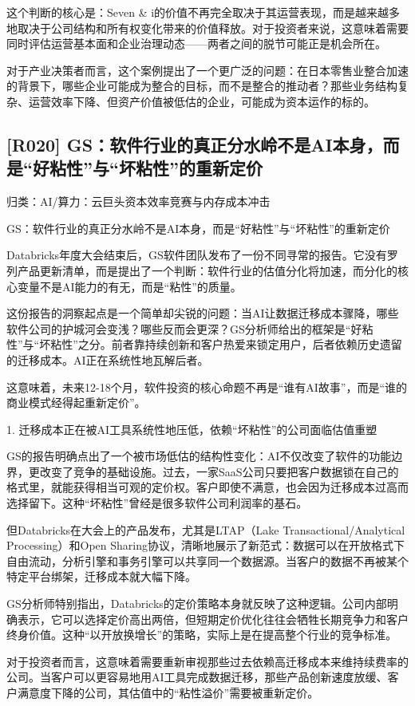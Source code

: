 \documentclass[11pt]{ctexart}
\begin{document}
这个判断的核心是：Seven \& i的价值不再完全取决于其运营表现，而是越来越多地取决于公司结构和所有权变化带来的价值释放。对于投资者来说，这意味着需要同时评估运营基本面和企业治理动态——两者之间的脱节可能正是机会所在。

对于产业决策者而言，这个案例提出了一个更广泛的问题：在日本零售业整合加速的背景下，哪些企业可能成为整合的目标，而不是整合的推动者？那些业务结构复杂、运营效率下降、但资产价值被低估的企业，可能成为资本运作的标的。

\subsection{[R020] GS：软件行业的真正分水岭不是AI本身，而是“好粘性”与“坏粘性”的重新定价}
{\small\color{refgray}归类：AI/算力：云巨头资本效率竞赛与内存成本冲击}

GS：软件行业的真正分水岭不是AI本身，而是“好粘性”与“坏粘性”的重新定价

Databricks年度大会结束后，GS软件团队发布了一份不同寻常的报告。它没有罗列产品更新清单，而是提出了一个判断：软件行业的估值分化将加速，而分化的核心变量不是AI能力的有无，而是“粘性”的质量。

这份报告的洞察起点是一个简单却尖锐的问题：当AI让数据迁移成本骤降，哪些软件公司的护城河会变浅？哪些反而会更深？GS分析师给出的框架是“好粘性”与“坏粘性”之分。前者靠持续创新和客户热爱来锁定用户，后者依赖历史遗留的迁移成本。AI正在系统性地瓦解后者。

这意味着，未来12-18个月，软件投资的核心命题不再是“谁有AI故事”，而是“谁的商业模式经得起重新定价”。

1. 迁移成本正在被AI工具系统性地压低，依赖“坏粘性”的公司面临估值重塑

GS的报告明确点出了一个被市场低估的结构性变化：AI不仅改变了软件的功能边界，更改变了竞争的基础设施。过去，一家SaaS公司只要把客户数据锁在自己的格式里，就能获得相当可观的定价权。客户即使不满意，也会因为迁移成本过高而选择留下。这种“坏粘性”曾经是很多软件公司利润率的基石。

但Databricks在大会上的产品发布，尤其是LTAP（Lake Transactional/Analytical Processing）和Open Sharing协议，清晰地展示了新范式：数据可以在开放格式下自由流动，分析引擎和事务引擎可以共享同一个数据源。当客户的数据不再被某个特定平台绑架，迁移成本就大幅下降。

GS分析师特别指出，Databricks的定价策略本身就反映了这种逻辑。公司内部明确表示，它可以选择定价高出两倍，但短期定价优化往往会牺牲长期竞争力和客户终身价值。这种“以开放换增长”的策略，实际上是在提高整个行业的竞争标准。

对于投资者而言，这意味着需要重新审视那些过去依赖高迁移成本来维持续费率的公司。当客户可以更容易地用AI工具完成数据迁移，那些产品创新速度放缓、客户满意度下降的公司，其估值中的“粘性溢价”需要被重新定价。
\end{document}

